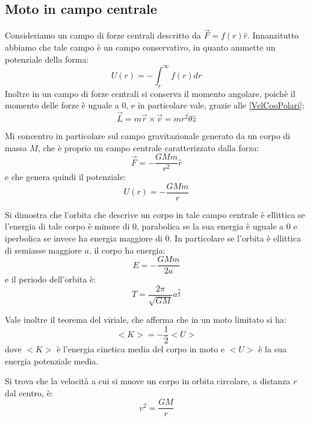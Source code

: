 \documentclass[../main.tex]{subfiles}
\begin{document}
\subsection{Moto in campo centrale}
Consideriamo un campo di forze centrali descritto da $\overrightarrow{F}=f(r)\hat{r}$. 
Innanzitutto abbiamo che tale campo è un campo conservativo, in quanto ammette un potenziale della forma:
\begin{equation*}
	U(r)=-\int_r^\infty{f(r) dr}
\end{equation*}
Inoltre in un campo di forze centrali si conserva il momento angolare, poichè il momento delle forze è uguale a 0,
e in particolare vale, grazie alle \cref{VelCooPolari}:
\begin{equation*}
	\overrightarrow{L}=m\overrightarrow{r}\times\overrightarrow{v}=mr^2\dot{\theta}\hat{z}
\end{equation*}

Mi concentro in particolare sul campo gravitazionale generato da un corpo di massa $M$, che è proprio un campo 
centrale caratterizzato dalla forza:
\begin{equation*}
	\overrightarrow{F}=-\frac{GMm}{r^2}\hat{r}
\end{equation*}
e che genera quindi il potenziale:
\begin{equation*}
	U(r)=-\frac{GMm}{r}
\end{equation*}

Si dimostra che l'orbita che descrive un corpo in tale campo centrale è ellittica se l'energia di tale corpo è
minore di 0, parabolica se la sua energia è uguale a 0 e iperbolica se invece ha energia maggiore di 0.
In particolare se l'orbita è ellittica di semiasse maggiore $a$, il corpo ha energia:
\begin{equation} \label{EnergiaTotaleOrbita}
	E=-\frac{GMm}{2a}
\end{equation}
e il periodo dell'orbita è:
\begin{equation} \label{PeriodoOrbita}
	T=\frac{2\pi}{\sqrt{GM}}a^{\frac{3}{2}}
\end{equation}

Vale inoltre il teorema del viriale, che afferma che in un moto limitato si ha:
\begin{equation} \label{TeoremaDelViriale}
	<K>=-\frac{1}{2}<U>
\end{equation}
dove $<K>$ è l'energia cinetica media del corpo in moto e $<U>$ è la sua energia potenziale media.

Si trova che la velocità a cui si muove un corpo in orbita circolare, a distanza $r$ dal centro, è:
\begin{equation} \label{VelocitaMotoCircolare}
	v^2=\frac{GM}{r}
\end{equation}
\end{document}
